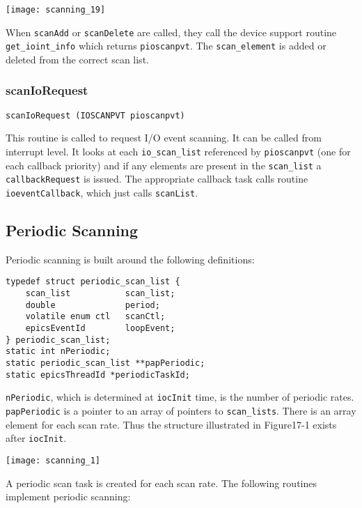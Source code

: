 \begin{center}
\texttt{[image: scanning\_19]}
\end{center}

When \verb|scanAdd| or \verb|scanDelete| are called, they call the device support routine \verb|get_ioint_info| which returns 
\verb|pioscanpvt|. The \verb|scan_element| is added or deleted from the correct scan list. 

\subsubsection{scanIoRequest}

\begin{verbatim}scanIoRequest (IOSCANPVT pioscanpvt)
\end{verbatim}This routine is called to request I/O event scanning. It can be called from interrupt level. It looks at each \verb|io_scan_list| 
referenced by \verb|pioscanpvt| (one for each callback priority) and if any elements are present in the \verb|scan_list| a 
\verb|callbackRequest| is issued. The appropriate callback task calls routine \verb|ioeventCallback|, which just calls 
\verb|scanList|. 

\subsection{Periodic Scanning}

Periodic scanning is built around the following definitions:

\begin{verbatim}typedef struct periodic_scan_list {
    scan_list           scan_list;
    double              period;
    volatile enum ctl   scanCtl;
    epicsEventId        loopEvent;
} periodic_scan_list;
static int nPeriodic;
static periodic_scan_list **papPeriodic;
static epicsThreadId *periodicTaskId;
\end{verbatim}\verb|nPeriodic|, which is determined at \verb|iocInit| time, is the number of periodic rates. \verb|papPeriodic| is a pointer to an 
array of pointers to \verb|scan_lists|. There is an array element for each scan rate. Thus the structure illustrated in 
Figure17-1 exists after \verb|iocInit|.

\begin{center}
\texttt{[image: scanning\_1]}
\end{center}

A periodic scan task is created for each scan rate. The following routines implement periodic scanning:

